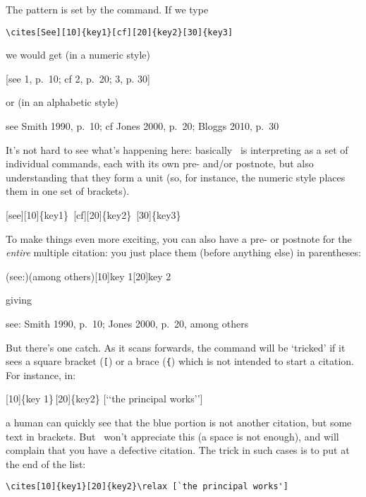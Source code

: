 The pattern is set by the  command. If we type
\begin{center}
\verb|\cites[See][10]{key1}[cf][20]{key2}[30]{key3]|
\end{center}
we would get (in a numeric style)
\begin{center}
[see 1, p.\ 10; cf 2, p.\ 20; 3, p. 30]
\end{center}
or (in an alphabetic style)
\begin{center}
see Smith 1990, p.\ 10; cf Jones 2000, p.\ 20; Bloggs 2010, p.\ 30
\end{center}

It's not hard to see what's happening here: basically \biblatex\ is
interpreting  as a set of individual  commands,
each with its own pre- and/or postnote, but also understanding that
they form a unit (so, for instance, the numeric style places them in
one set of brackets).
\begin{center}
\ttfamily
{}\colorbox{red!30}{[see][10]\{key1\}}\,%
\colorbox{green!30}{[cf][20]\{key2\}}\,%
\colorbox{blue!30}{[30]\{key3\}}
\end{center}

To make things even more exciting, you can also have a pre- or
postnote for the \emph{entire} multiple citation: you just place them
(before anything else) in parentheses:
\begin{center}
\ttfamily
{}(see:)(among others)[10]{key 1}[20]{key 2}
\end{center}
giving
\begin{center}
see: Smith 1990, p.\ 10; Jones 2000, p.\ 20, among others
\end{center}

But there's one catch. As it scans forwards, the  command will
be `tricked' if it sees a square bracket (\texttt[) or a brace
(\texttt\{) which is not intended to start a citation. For instance,
in:
\begin{center}
\ttfamily
{}\colorbox{red!30}{[10]\{key
  1\}}\,\colorbox{green!30}{[20]\{key2\}}
\colorbox{blue!30}{[`{}`the principal works'{}']}
\end{center}
a human can quickly see that the blue portion is not another
citation, but some text in brackets. But \biblatex\ won't appreciate
this (a space is not enough), and will complain that you have a
defective citation. The trick in such cases is to put  at
the end of the list:
\begin{center}
\verb|\cites[10]{key1}[20]{key2}\relax [`the principal works']|
\end{center}

